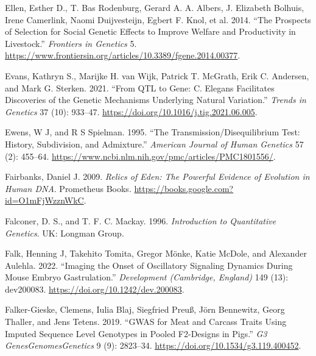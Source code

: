 \documentclass[
]{book}
\newlength{\cslhangindent}
\newlength{\cslentryspacingunit} %
\newenvironment{CSLReferences}[2] %
 {%
  \setlength{\parindent}{0pt}
  \ifodd #1
  \let\oldpar\par
  \def\par{\hangindent=\cslhangindent\oldpar}
  \fi
  \setlength{\parskip}{#2\cslentryspacingunit}
 }%
 {}
\begin{document}
\begin{CSLReferences}{1}{0}
\leavevmode{}%
Ellen, Esther D., T. Bas Rodenburg, Gerard A. A. Albers, J. Elizabeth Bolhuis, Irene Camerlink, Naomi Duijvesteijn, Egbert F. Knol, et al. 2014. {``The Prospects of Selection for Social Genetic Effects to Improve Welfare and Productivity in Livestock.''} \emph{Frontiers in Genetics} 5. \url{https://www.frontiersin.org/articles/10.3389/fgene.2014.00377}.

\leavevmode{}%
Evans, Kathryn S., Marijke H. van Wijk, Patrick T. McGrath, Erik C. Andersen, and Mark G. Sterken. 2021. {``From {QTL} to Gene: {C}. Elegans Facilitates Discoveries of the Genetic Mechanisms Underlying Natural Variation.''} \emph{Trends in Genetics} 37 (10): 933--47. \url{https://doi.org/10.1016/j.tig.2021.06.005}.

\leavevmode{}%
Ewens, W J, and R S Spielman. 1995. {``The Transmission/Disequilibrium Test: History, Subdivision, and Admixture.''} \emph{American Journal of Human Genetics} 57 (2): 455--64. \url{https://www.ncbi.nlm.nih.gov/pmc/articles/PMC1801556/}.

\leavevmode{}%
Fairbanks, Daniel J. 2009. \emph{Relics of {Eden}: {The Powerful Evidence} of {Evolution} in {Human DNA}}. {Prometheus Books}. \url{https://books.google.com?id=O1mFjWzznWkC}.

\leavevmode{}%
Falconer, D. S., and T. F. C. Mackay. 1996. \emph{Introduction to Quantitative Genetics}. {UK: Longman Group}.

\leavevmode{}%
Falk, Henning J, Takehito Tomita, Gregor Mönke, Katie McDole, and Alexander Aulehla. 2022. {``Imaging the Onset of Oscillatory Signaling Dynamics During Mouse Embryo Gastrulation.''} \emph{Development (Cambridge, England)} 149 (13): dev200083. \url{https://doi.org/10.1242/dev.200083}.

\leavevmode{}%
Falker-Gieske, Clemens, Iulia Blaj, Siegfried Preuß, Jörn Bennewitz, Georg Thaller, and Jens Tetens. 2019. {``{GWAS} for {Meat} and {Carcass Traits Using Imputed Sequence Level Genotypes} in {Pooled F2-Designs} in {Pigs}.''} \emph{G3 Genes\textbar Genomes\textbar Genetics} 9 (9): 2823--34. \url{https://doi.org/10.1534/g3.119.400452}.


\end{CSLReferences}
\end{document}
